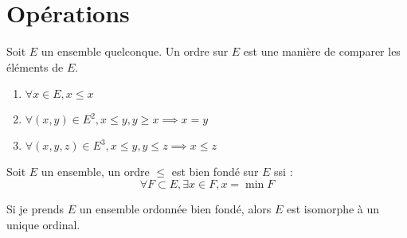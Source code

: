 \section{Opérations}

\begin{definition}[ordre]
    Soit \(E\) un ensemble quelconque. Un ordre sur \(E\) est une manière de comparer les éléments de \(E\). 
    \begin{enumerate}
        \item \(\forall x \in E, x\leq x\)\\
        \item \(\forall (x,y) \in E^{2}, x \leq y , y\geq x \implies  x = y\) \\
        \item \(\forall (x,y,z) \in E^{3}, x\leq y, y\leq z \implies x\leq z\)   
    \end{enumerate}
\end{definition}

\begin{definition}
    Soit \(E\) un ensemble, un ordre \(\leq\) est bien fondé sur \(E\) ssi : 
    \[
        \forall F \subset E, \exists x \in F, x = \min F
    \] 
\end{definition}

\begin{theorem}[Isomorphisme]
    Si je prends \(E\) un ensemble ordonnée bien fondé, alors \(E\) est isomorphe à un unique ordinal.  
\end{theorem}